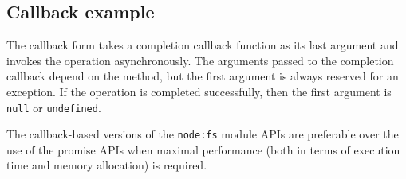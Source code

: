 \subsection{Callback example}\label{callback-example}

The callback form takes a completion callback function as its last
argument and invokes the operation asynchronously. The arguments passed
to the completion callback depend on the method, but the first argument
is always reserved for an exception. If the operation is completed
successfully, then the first argument is \texttt{null} or
\texttt{undefined}.

\begin{Shaded}
\begin{Highlighting}[]
 \OperatorTok{;}

\NormalTok{(}\OperatorTok{,}\KeywordTok{=\textgreater{}}\NormalTok{ \{}
  \OperatorTok{;}
  \NormalTok{(}\NormalTok{)}\OperatorTok{;}
\NormalTok{\})}\OperatorTok{;}
\end{Highlighting}
\end{Shaded}

\begin{Shaded}
\begin{Highlighting}[]
\OperatorTok{=} \NormalTok{(}\NormalTok{)}\OperatorTok{;}

\NormalTok{(}\OperatorTok{,}\KeywordTok{=\textgreater{}}\NormalTok{ \{}
  \OperatorTok{;}
  \NormalTok{(}\NormalTok{)}\OperatorTok{;}
\NormalTok{\})}\OperatorTok{;}
\end{Highlighting}
\end{Shaded}

The callback-based versions of the \texttt{node:fs} module APIs are
preferable over the use of the promise APIs when maximal performance
(both in terms of execution time and memory allocation) is required.

